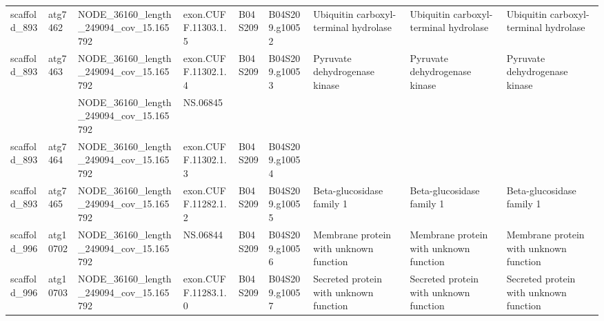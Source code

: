 \begin{longtable}{lllllllll}
   scaffold\_893 &   atg7462 &  NODE\_36160\_length\_249094\_cov\_15.165792 &   exon.CUFF.11303.1.5 &      B04S209 &  B04S209.g10052 &                                           Ubiquitin carboxyl-terminal hydrolase &                                           Ubiquitin carboxyl-terminal hydrolase &                                           Ubiquitin carboxyl-terminal hydrolase \\
   scaffold\_893 &   atg7463 &  NODE\_36160\_length\_249094\_cov\_15.165792 &   exon.CUFF.11302.1.4 &      B04S209 &  B04S209.g10053 &                                                   Pyruvate dehydrogenase kinase &                                                   Pyruvate dehydrogenase kinase &                                                   Pyruvate dehydrogenase kinase \\
                &           &  NODE\_36160\_length\_249094\_cov\_15.165792 &              NS.06845 &              &                 &                                                                                 &                                                                                 &                                                                                 \\
   scaffold\_893 &   atg7464 &  NODE\_36160\_length\_249094\_cov\_15.165792 &   exon.CUFF.11302.1.3 &      B04S209 &  B04S209.g10054 &                                                                                 &                                                                                 &                                                                                 \\
   scaffold\_893 &   atg7465 &  NODE\_36160\_length\_249094\_cov\_15.165792 &   exon.CUFF.11282.1.2 &      B04S209 &  B04S209.g10055 &                                                       Beta-glucosidase family 1 &                                                       Beta-glucosidase family 1 &                                                       Beta-glucosidase family 1 \\
   scaffold\_996 &  atg10702 &  NODE\_36160\_length\_249094\_cov\_15.165792 &              NS.06844 &      B04S209 &  B04S209.g10056 &                                          Membrane protein with unknown function &                                          Membrane protein with unknown function &                                          Membrane protein with unknown function \\
   scaffold\_996 &  atg10703 &  NODE\_36160\_length\_249094\_cov\_15.165792 &   exon.CUFF.11283.1.0 &      B04S209 &  B04S209.g10057 &                                          Secreted protein with unknown function &                                          Secreted protein with unknown function &                                          Secreted protein with unknown function \\

\end{longtable}
